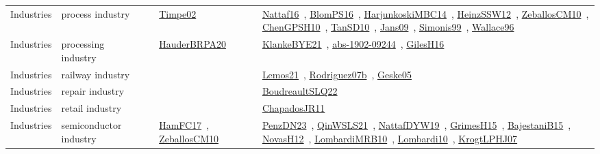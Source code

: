 {\begin{longtable}{lp{3cm}>{\raggedright\arraybackslash}p{6cm}>{\raggedright\arraybackslash}p{6cm}>{\raggedright\arraybackslash}p{8cm}}
\index{process industry}\index{Industries!process industry}Industries & process industry &  & \href{../works/Timpe02.pdf}{Timpe02}~\cite{Timpe02} & \href{../works/Nattaf16.pdf}{Nattaf16}~\cite{Nattaf16}, \href{../works/BlomPS16.pdf}{BlomPS16}~\cite{BlomPS16}, \href{../works/HarjunkoskiMBC14.pdf}{HarjunkoskiMBC14}~\cite{HarjunkoskiMBC14}, \href{../works/HeinzSSW12.pdf}{HeinzSSW12}~\cite{HeinzSSW12}, \href{../works/ZeballosCM10.pdf}{ZeballosCM10}~\cite{ZeballosCM10}, \href{../works/ChenGPSH10.pdf}{ChenGPSH10}~\cite{ChenGPSH10}, \href{../works/TanSD10.pdf}{TanSD10}~\cite{TanSD10}, \href{../works/Jans09.pdf}{Jans09}~\cite{Jans09}, \href{../works/Simonis99.pdf}{Simonis99}~\cite{Simonis99}, \href{../works/Wallace96.pdf}{Wallace96}~\cite{Wallace96}\\
\index{processing industry}\index{Industries!processing industry}Industries & processing industry &  & \href{../works/HauderBRPA20.pdf}{HauderBRPA20}~\cite{HauderBRPA20} & \href{../works/KlankeBYE21.pdf}{KlankeBYE21}~\cite{KlankeBYE21}, \href{../works/abs-1902-09244.pdf}{abs-1902-09244}~\cite{abs-1902-09244}, \href{../works/GilesH16.pdf}{GilesH16}~\cite{GilesH16}\\
\index{railway industry}\index{Industries!railway industry}Industries & railway industry &  &  & \href{../works/Lemos21.pdf}{Lemos21}~\cite{Lemos21}, \href{../works/Rodriguez07b.pdf}{Rodriguez07b}~\cite{Rodriguez07b}, \href{../works/Geske05.pdf}{Geske05}~\cite{Geske05}\\
\index{repair industry}\index{Industries!repair industry}Industries & repair industry &  &  & \href{../works/BoudreaultSLQ22.pdf}{BoudreaultSLQ22}~\cite{BoudreaultSLQ22}\\
\index{retail industry}\index{Industries!retail industry}Industries & retail industry &  &  & \href{../works/ChapadosJR11.pdf}{ChapadosJR11}~\cite{ChapadosJR11}\\
\index{semiconductor industry}\index{Industries!semiconductor industry}Industries & semiconductor industry &  & \href{../works/HamFC17.pdf}{HamFC17}~\cite{HamFC17}, \href{../works/ZeballosCM10.pdf}{ZeballosCM10}~\cite{ZeballosCM10} & \href{../works/PenzDN23.pdf}{PenzDN23}~\cite{PenzDN23}, \href{../works/QinWSLS21.pdf}{QinWSLS21}~\cite{QinWSLS21}, \href{../works/NattafDYW19.pdf}{NattafDYW19}~\cite{NattafDYW19}, \href{../works/GrimesH15.pdf}{GrimesH15}~\cite{GrimesH15}, \href{../works/BajestaniB15.pdf}{BajestaniB15}~\cite{BajestaniB15}, \href{../works/NovasH12.pdf}{NovasH12}~\cite{NovasH12}, \href{../works/LombardiMRB10.pdf}{LombardiMRB10}~\cite{LombardiMRB10}, \href{../works/Lombardi10.pdf}{Lombardi10}~\cite{Lombardi10}, \href{../works/KrogtLPHJ07.pdf}{KrogtLPHJ07}~\cite{KrogtLPHJ07}\\

\end{longtable}}
